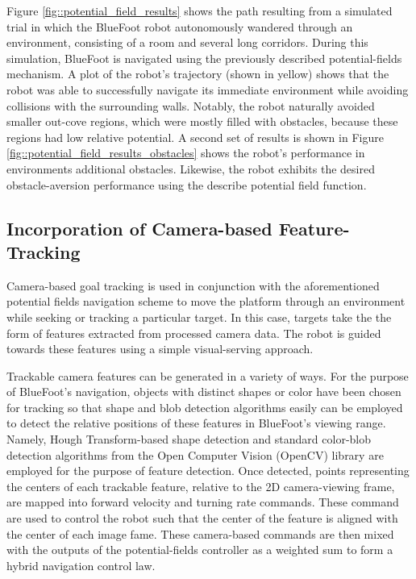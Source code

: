 			Figure \ref{fig::potential_field_results} shows the path resulting from a simulated trial in which the BlueFoot robot autonomously wandered through an environment, consisting of a room and several long corridors. During this simulation, BlueFoot is navigated using the previously described potential-fields mechanism. A plot of the robot's trajectory (shown in yellow) shows that the robot was able to successfully navigate its immediate environment while avoiding collisions with the surrounding walls. Notably, the robot naturally avoided smaller out-cove regions, which were mostly filled with obstacles, because these regions had low relative potential. A second set of results is shown in Figure \ref{fig::potential_field_results_obstacles} shows the robot's performance in environments additional obstacles. Likewise, the robot exhibits the desired obstacle-aversion performance using the describe potential field function.


		\subsection{Incorporation of Camera-based Feature-Tracking}
		
			Camera-based goal tracking is used in conjunction with the aforementioned potential fields navigation scheme to move the platform through an environment while seeking or tracking a particular target. In this case, targets take the the form of features extracted from processed camera data. The robot is guided towards these features using a simple visual-serving approach. 

			Trackable camera features can be generated in a variety of ways. For the purpose of BlueFoot's navigation, objects with distinct shapes or color have been chosen for tracking so that shape and blob detection algorithms easily can be employed to detect the relative positions of these features in BlueFoot's viewing range. Namely, Hough Transform-based shape detection and standard color-blob detection algorithms from the Open Computer Vision (OpenCV) library are employed for the purpose of feature detection\cite{opencv_library}. Once detected, points representing the centers of each trackable feature, relative to the 2D camera-viewing frame, are mapped into forward velocity and turning rate commands. These command are used to control the robot such that the center of the feature is aligned with the center of each image fame. These camera-based commands are then mixed with the outputs of the potential-fields controller as a weighted sum to form a hybrid navigation control law.

